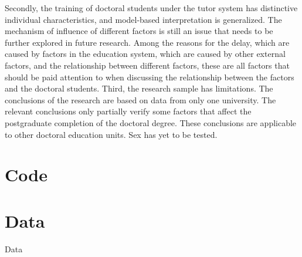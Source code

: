 \documentclass{mcmthesis}
\begin{document}
Secondly, the training of doctoral students under the tutor system has
distinctive individual characteristics, and model-based interpretation is
generalized. The mechanism of influence of different factors is still an issue
that needs to be further explored in future research. Among the reasons for the
delay, which are caused by factors in the education system, which are caused by
other external factors, and the relationship between different factors, these
are all factors that should be paid attention to when discussing the
relationship between the factors and the doctoral students. Third, the research
sample has limitations. The conclusions of the research are based on data from
only one university. The relevant conclusions only partially verify some factors
that affect the postgraduate completion of the doctoral degree. These
conclusions are applicable to other doctoral education units. Sex has yet to be
tested.


\newpage





\begin{appendices}

	\section{Code}


	\section{Data}

	\begin{table}[htbp]
		\centering
		\caption{Data}
		\label{tab:Data}
	\end{table}

\end{appendices}
\end{document}
